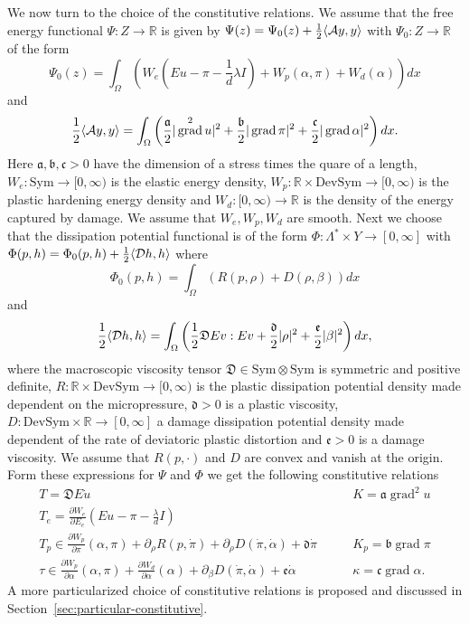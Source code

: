 \documentclass[a4paper,10pt,twoside]{amsbook}
\numberwithin{section}{chapter}
\numberwithin{equation}{chapter}
\theoremstyle{definition}
\DeclareMathOperator{\grad}{grad}
\DeclarePairedDelimiter{\dual}{\langle}{\rangle}
\newcommand{\dind}[2]{\frac{\partial #1}{\partial #2}}
\begin{document}
We now turn to the choice of the constitutive relations. We assume that the free energy functional $\Psi\colon Z\to\mathbb{R}$ is given by $\Psi(z)=\Psi_0(z)+\frac{1}{2}\dual{\mathcal{A}y,y}$ with $\Psi_0\colon Z\to\mathbb{R}$ of the form
\[
\Psi_0(z)=\int_\Omega\left(W_e\left(Eu-\pi-\frac{1}{d}\lambda I\right)+W_p(\alpha,\pi)+W_d(\alpha)\right)dx
\]
and
\begin{equation}
\label{eqn:energy-gradients}
\frac{1}{2}\dual{\mathcal{A}y,y}=\int_\Omega\left(\frac{\mathfrak{a}}{2}|\grad^2u|^2+\frac{\mathfrak{b}}{2}|\grad\pi|^2+\frac{\mathfrak{c}}{2}|\grad\alpha|^2\right)dx.
\end{equation}
Here $\mathfrak{a},\mathfrak{b},\mathfrak{c}>0$ have the dimension of a stress times the quare of a length, $W_e\colon\text{Sym}\to[0,\infty)$ is the elastic energy density, $W_p\colon\mathbb{R}\times\text{DevSym}\to[0,\infty)$ is the plastic hardening energy density and $W_d\colon[0,\infty)\to\mathbb{R}$ is the density of the energy captured by damage. We assume that $W_e,W_p,W_d$ are smooth. Next we choose that the dissipation potential functional is of the form $\Phi\colon\Lambda^*\times Y\to[0,\infty]$ with $\Phi(p,h)=\Phi_0(p,h)+\frac{1}{2}\dual{\mathcal{D}h,h}$ where
\[
\Phi_0(p,h)=\int_\Omega\left(R(p,\rho)+D(\rho,\beta)\right)dx
\]
and
\[
\frac{1}{2}\dual{\mathcal{D}h,h}=\int_\Omega\left(\frac{1}{2}\mathfrak{D}Ev:Ev+\frac{\mathfrak{d}}{2}|\rho|^2+\frac{\mathfrak{e}}{2}|\beta|^2\right)dx,
\]
where the macroscopic viscosity tensor $\mathfrak{D}\in\text{Sym}\otimes\text{Sym}$ is symmetric and positive definite, $R\colon\mathbb{R}\times\text{DevSym}\to[0,\infty)$ is the plastic dissipation potential density made dependent on the micropressure, $\mathfrak{d}>0$ is a plastic viscosity, $D\colon\text{DevSym}\times\mathbb{R}\to[0,\infty]$ a damage dissipation potential density made dependent of the rate of deviatoric plastic distortion and $\mathfrak{e}>0$ is a damage viscosity. We assume that $R(p,\cdot)$ and $D$ are convex and vanish at the origin. Form these expressions for $\Psi$ and $\Phi$ we get the following constitutive relations
\begin{align}
T=\mathfrak{D}E\dot u\qquad & K=\mathfrak{a}\grad^2u \\
T_e=\dind{W_e}{E_e}\left(Eu-\pi-\frac{\lambda}{d}I\right)\qquad & \\
T_p\in\dind{W_p}{\pi}(\alpha,\pi)+\partial_\rho R(p,\dot\pi)+\partial_\rho D(\dot\pi,\dot\alpha)+\mathfrak{d}\dot\pi\qquad & K_p=\mathfrak{b}\grad\pi \\
\tau\in \dind{W_p}{\alpha}(\alpha,\pi)+\dind{W_d}{\alpha}(\alpha)+\partial_\beta D(\dot\pi,\dot\alpha)+\mathfrak{e}\dot\alpha\qquad & \kappa=\mathfrak{c}\grad\alpha.
\end{align}
A more particularized choice of constitutive relations is proposed and discussed in Section~\ref{sec:particular-constitutive}.
\end{document}
